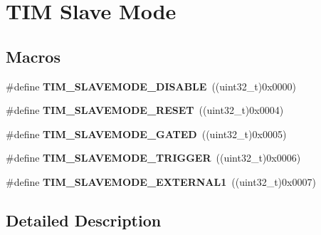 \hypertarget{group___t_i_m___slave___mode}{\section{T\-I\-M Slave Mode}
\label{group___t_i_m___slave___mode}
}
\subsection*{Macros}
\begin{DoxyCompactItemize}
\item 
\hypertarget{group___t_i_m___slave___mode_ga3b53e1a85d08f125df4371f86bdaf79b}{\#define {\bfseries T\-I\-M\-\_\-\-S\-L\-A\-V\-E\-M\-O\-D\-E\-\_\-\-D\-I\-S\-A\-B\-L\-E}~((uint32\-\_\-t)0x0000)}\label{group___t_i_m___slave___mode_ga3b53e1a85d08f125df4371f86bdaf79b}

\item 
\hypertarget{group___t_i_m___slave___mode_ga9f28e350c0560dc550f5c0d2f8b39ba7}{\#define {\bfseries T\-I\-M\-\_\-\-S\-L\-A\-V\-E\-M\-O\-D\-E\-\_\-\-R\-E\-S\-E\-T}~((uint32\-\_\-t)0x0004)}\label{group___t_i_m___slave___mode_ga9f28e350c0560dc550f5c0d2f8b39ba7}

\item 
\hypertarget{group___t_i_m___slave___mode_ga4501317fcd7649e5ff46db6fe69938e0}{\#define {\bfseries T\-I\-M\-\_\-\-S\-L\-A\-V\-E\-M\-O\-D\-E\-\_\-\-G\-A\-T\-E\-D}~((uint32\-\_\-t)0x0005)}\label{group___t_i_m___slave___mode_ga4501317fcd7649e5ff46db6fe69938e0}

\item 
\hypertarget{group___t_i_m___slave___mode_ga12f8f7b4a16b438f54cf811f0bb0a8a4}{\#define {\bfseries T\-I\-M\-\_\-\-S\-L\-A\-V\-E\-M\-O\-D\-E\-\_\-\-T\-R\-I\-G\-G\-E\-R}~((uint32\-\_\-t)0x0006)}\label{group___t_i_m___slave___mode_ga12f8f7b4a16b438f54cf811f0bb0a8a4}

\item 
\hypertarget{group___t_i_m___slave___mode_ga90dcf32a66dcb250b18da2ff56471328}{\#define {\bfseries T\-I\-M\-\_\-\-S\-L\-A\-V\-E\-M\-O\-D\-E\-\_\-\-E\-X\-T\-E\-R\-N\-A\-L1}~((uint32\-\_\-t)0x0007)}\label{group___t_i_m___slave___mode_ga90dcf32a66dcb250b18da2ff56471328}

\end{DoxyCompactItemize}


\subsection{Detailed Description}
